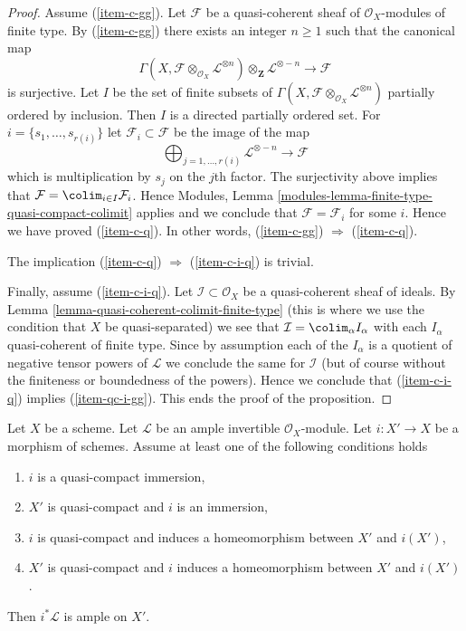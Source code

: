 \begin{proof}
\medskip\noindent
Assume (\ref{item-c-gg}). Let $\mathcal{F}$ be a quasi-coherent
sheaf of $\mathcal{O}_X$-modules of finite type.
By (\ref{item-c-gg}) there exists an integer $n \geq 1$ such that
the canonical map
$$
\Gamma(X, \mathcal{F} \otimes_{\mathcal{O}_X} \mathcal{L}^{\otimes n})
\otimes_{\mathbf{Z}} \mathcal{L}^{\otimes -n}
\longrightarrow
\mathcal{F}
$$
is surjective. Let $I$ be the set of finite subsets of
$\Gamma(X, \mathcal{F} \otimes_{\mathcal{O}_X} \mathcal{L}^{\otimes n})$
partially ordered by inclusion. Then $I$ is a directed partially ordered set.
For $i = \{s_1, \ldots, s_{r(i)}\}$ let $\mathcal{F}_i \subset \mathcal{F}$
be the image of the map
$$
\bigoplus\nolimits_{j = 1, \ldots, r(i)} \mathcal{L}^{\otimes -n}
\longrightarrow
\mathcal{F}
$$
which is multiplication by $s_j$ on the $j$th factor. The surjectivity above
implies that $\mathcal{F} = \colim_{i \in I} \mathcal{F}_i$.
Hence Modules, Lemma \ref{modules-lemma-finite-type-quasi-compact-colimit}
applies and we conclude that
$\mathcal{F} = \mathcal{F}_i$ for some $i$.
Hence we have proved (\ref{item-c-q}). In other words,
(\ref{item-c-gg}) $\Rightarrow$ (\ref{item-c-q}).

\medskip\noindent
The implication (\ref{item-c-q}) $\Rightarrow$ (\ref{item-c-i-q}) is trivial.

\medskip\noindent
Finally, assume (\ref{item-c-i-q}).
Let $\mathcal{I} \subset \mathcal{O}_X$ be a quasi-coherent sheaf
of ideals. By Lemma \ref{lemma-quasi-coherent-colimit-finite-type}
(this is where we use the condition that $X$ be quasi-separated)
we see that $\mathcal{I} = \colim_\alpha I_\alpha$ with
each $I_\alpha$ quasi-coherent of finite type. Since by assumption each of
the $I_\alpha$ is a quotient of negative tensor powers of
$\mathcal{L}$ we conclude the same for $\mathcal{I}$ (but of course
without the finiteness or boundedness of the powers). Hence
we conclude that (\ref{item-c-i-q}) implies (\ref{item-qc-i-gg}).
This ends the proof of the proposition.
\end{proof}

\begin{lemma}
\label{lemma-ample-on-locally-closed}
Let $X$ be a scheme. Let $\mathcal{L}$ be an ample invertible
$\mathcal{O}_X$-module. Let $i : X' \to X$ be a morphism of schemes.
Assume at least one of the following conditions holds
\begin{enumerate}
\item $i$ is a quasi-compact immersion,
\item $X'$ is quasi-compact and $i$ is an immersion,
\item $i$ is quasi-compact and induces a homeomorphism
between $X'$ and $i(X')$,
\item $X'$ is quasi-compact and $i$ induces a homeomorphism
between $X'$ and $i(X')$.
\end{enumerate}
Then $i^*\mathcal{L}$ is ample on $X'$.
\end{lemma}

